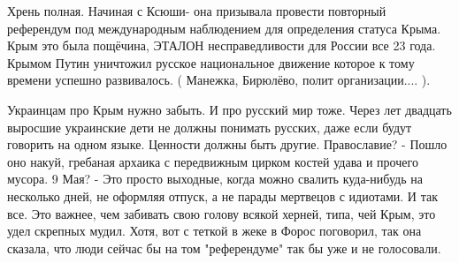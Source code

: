 \begin{itemize}
Хрень полная. Начиная с Ксюши- она призывала провести повторный референдум под
международным наблюдением для определения статуса Крыма. Крым это была
пощёчина, ЭТАЛОН несправедливости для России все 23 года. Крымом Путин
уничтожил русское национальное движение которое к тому времени успешно
развивалось. ( Манежка, Бирюлёво, полит организации.... ).


Украинцам про Крым нужно забыть. И про русский мир тоже. Через лет двадцать
выросшие украинские дети не должны понимать русских, даже если будут говорить
на одном языке. Ценности должны быть другие. Православие? - Пошло оно накуй,
гребаная архаика с передвижным цирком костей удава и прочего мусора. 9 Мая? -
Это просто выходные, когда можно свалить куда-нибудь на несколько дней, не
оформляя отпуск, а не парады мертвецов с идиотами. И так все. Это важнее, чем
забивать свою голову всякой херней, типа, чей Крым, это удел скрепных мудил.
Хотя, вот с теткой в жеке в Форос поговорил, так она сказала, что люди сейчас
бы на том "референдуме" так бы уже и не голосовали.

\end{itemize} %
